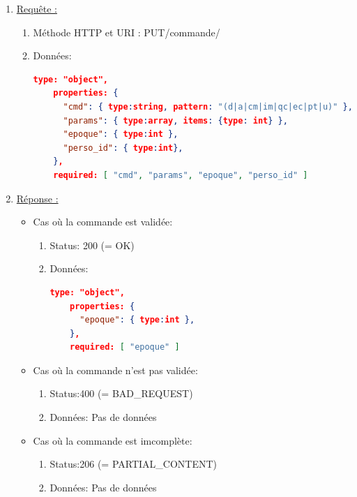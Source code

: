 \documentclass[11pt, a4paper]{article}
\begin{document}
  \begin{enumerate}
   \item \underline{Requête :}
    \begin{enumerate}
     \item Méthode HTTP et URI : PUT/commande/
     \item Données:
	\begin{lstlisting}[language=JSON]
	type: "object",
	properties: {
	  "cmd": { type:string, pattern: "(d|a|cm|im|qc|ec|pt|u)" },
	  "params": { type:array, items: {type: int} },
	  "epoque": { type:int },
	  "perso_id": { type:int},
	},
	required: [ "cmd", "params", "epoque", "perso_id" ]
	\end{lstlisting}      
    \end{enumerate}

   \item \underline{Réponse :}
   \begin{itemize}
    \item Cas où la commande est validée:
    \begin{enumerate}
     \item Status: 200 (= OK)
     \item Données:
	\begin{lstlisting}[language=JSON]
	type: "object",
	properties: {
	  "epoque": { type:int },
	},
	required: [ "epoque" ]
	\end{lstlisting} 
    \end{enumerate}

    \item Cas où la commande n'est pas validée:
    \begin{enumerate}
     \item Status:400 (= BAD\_REQUEST)
     \item Données: Pas de données\\
    \end{enumerate}

    \item Cas où la commande est imcomplète:
    \begin{enumerate}
     \item Status:206 (= PARTIAL\_CONTENT)
     \item Données: Pas de données
    \end{enumerate}
    
   \end{itemize}

  \end{enumerate}
\end{document}
